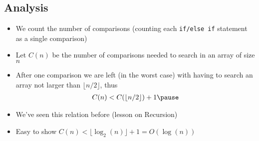 
\begin{slide}
\section[-1]{Analysis}

\begin{PauseHighLight}
  \begin{itemize}
  \item We count the number of comparisons (counting each
    \texttt{if/else if} statement as a single comparison)\pause
  \item Let $C(n)$ be the number of comparisons needed to search in an
    array of size $n$\pause
  \item After one comparison we are left (in the worst case) with having
    to search an array not larger than $\lfloor n/2 \rfloor$\pause, thus
    \begin{align*}
      C(n) < C(\lfloor n/2 \rfloor) + 1\pause
    \end{align*}
  \item We've seen this relation before (lesson on Recursion)\pause
  \item Easy to show $C(n) < \lfloor \log_2(n) \rfloor+1 = O(\log(n))$\pause
  \end{itemize}
\end{PauseHighLight}

\end{slide}

\Outline %

